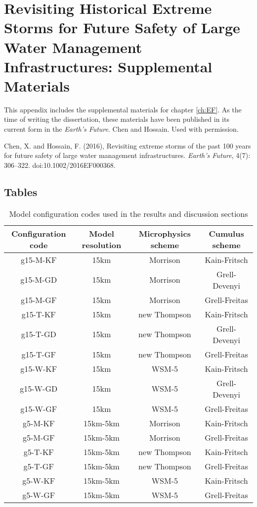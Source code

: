\chapter{Revisiting Historical Extreme Storms for Future Safety of Large Water Management Infrastructures: Supplemental Materials}




This appendix includes the supplemental materials for chapter \ref{ch:EF}. As the time of writing the dissertation, these materials have been published in its current form in the \textit{Earth's Future}. \textcopyright Chen and Hossain. Used with permission.\\

\bigbreak

\noindent
{}
\setlength{\hangindent}{2em}
Chen, X. and Hossain, F. (2016), Revisiting extreme storms of the past 100 years for future safety of large water management infrastructures. \textit{Earth's Future}, 4(7): 306–322. doi:10.1002/2016EF000368.

\vspace{10mm}

\noindent

\section{Tables}

\begin{table}[htbp]
	\centering
	\caption{Model configuration codes used in the results and discussion sections}
	\begin{tabular}{cccc}
		\hline
		Configuration code & Model resolution & Microphysics scheme & Cumulus scheme\\
		\hline
		g15-M-KF & 15km & Morrison     & Kain-Fritsch\\
		g15-M-GD & 15km & Morrison     & Grell-Devenyi\\
		g15-M-GF & 15km & Morrison     & Grell-Freitas\\
		g15-T-KF & 15km & new Thompson & Kain-Fritsch\\
		g15-T-GD & 15km & new Thompson & Grell-Devenyi\\
		g15-T-GF & 15km & new Thompson & Grell-Freitas\\
		g15-W-KF & 15km & WSM-5        & Kain-Fritsch\\
		g15-W-GD & 15km & WSM-5        & Grell-Devenyi\\
		g15-W-GF & 15km & WSM-5        & Grell-Freitas\\
		g5-M-KF & 15km-5km & Morrison     & Kain-Fritsch\\
		g5-M-GF & 15km-5km & Morrison     & Grell-Freitas\\
		g5-T-KF & 15km-5km & new Thompson & Kain-Fritsch\\
		g5-T-GF & 15km-5km & new Thompson & Grell-Freitas\\
		g5-W-KF & 15km-5km & WSM-5        & Kain-Fritsch\\
		g5-W-GF & 15km-5km & WSM-5        & Grell-Freitas\\
		\hline
	\end{tabular}
	\label{table:3-S1}
\end{table}

